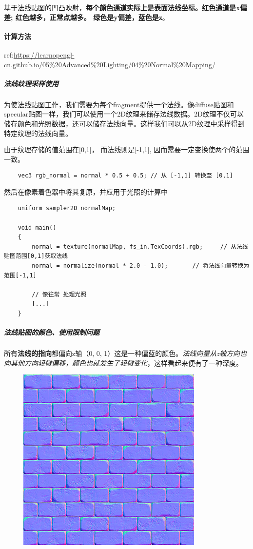 \documentclass[UTF8,a4paper,12pt]{ctexbook}
\begin{document}
			基于法线贴图的凹凸映射，\textbf{每个颜色通道实际上是表面法线坐标。红色通道是x偏差; 红色越多，正常点越多。 绿色是y偏差，蓝色是z}。
			
			\paragraph{计算方法}
				ref:\url{https://learnopengl-cn.github.io/05%20Advanced%20Lighting/04%20Normal%20Mapping/}
				
				\subparagraph{法线纹理采样使用}
					为使法线贴图工作，我们需要为每个fragment提供一个法线。像diffuse贴图和specular贴图一样，我们可以使用一个2D纹理来储存法线数据。2D纹理不仅可以储存颜色和光照数据，还可以储存法线向量。这样我们可以从2D纹理中采样得到特定纹理的法线向量。
					
					由于纹理存储的值范围在[0,1]， 而法线则是[-1,1], 因而需要一定变换使两个的范围一致。
					\begin{lstlisting}
	vec3 rgb_normal = normal * 0.5 + 0.5; // 从 [-1,1] 转换至 [0,1]				
					\end{lstlisting}
					
					然后在像素着色器中将其复原，并应用于光照的计算中
					\begin{lstlisting}
	uniform sampler2D normalMap;  
	
	void main()
	{           
	    normal = texture(normalMap, fs_in.TexCoords).rgb;     // 从法线贴图范围[0,1]获取法线
	    normal = normalize(normal * 2.0 - 1.0);       // 将法线向量转换为范围[-1,1]
	
	    // 像往常 处理光照
	    [...]
	}				
					\end{lstlisting}
				
				\subparagraph{法线贴图的颜色、使用限制问题}
					所有\textbf{法线的指向}都偏向z轴（0, 0, 1）这是一种偏蓝的颜色。\textit{法线向量从z轴方向也向其他方向轻微偏移，颜色也就发生了轻微变化}，这样看起来便有了一种深度。
				
					\begin{figure}[H]
						\centering
						\includegraphics[width=.55\linewidth]{normalMapE}
					\end{figure}
					
\end{document}
